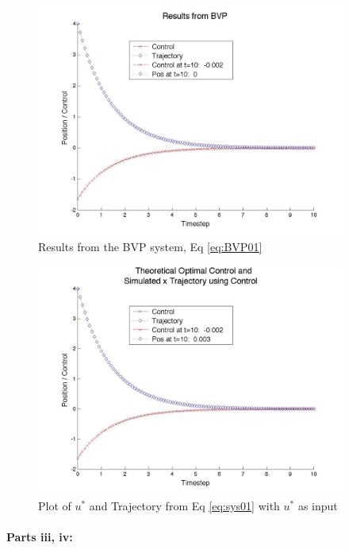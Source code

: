\documentclass[12pt, notitlepage, letterpaper]{article}
\begin{document}
\begin{figure}[h]
\begin{center}
\includegraphics[width=4in]{BVPOrig}
\caption{\label{fig:BVP} Results from the BVP system, Eq \ref{eq:BVP01}}
\end{center}
\end{figure}

\begin{figure}[h]
\begin{center}
\includegraphics[width=4in]{OpenTrajCont0to10}
\caption{\label{fig:OrigSys} Plot of $u^*$ and Trajectory from Eq \ref{eq:sys01} with $u^*$ as input}
\end{center}
\end{figure}

\paragraph{Parts iii, iv:}
\end{document}
